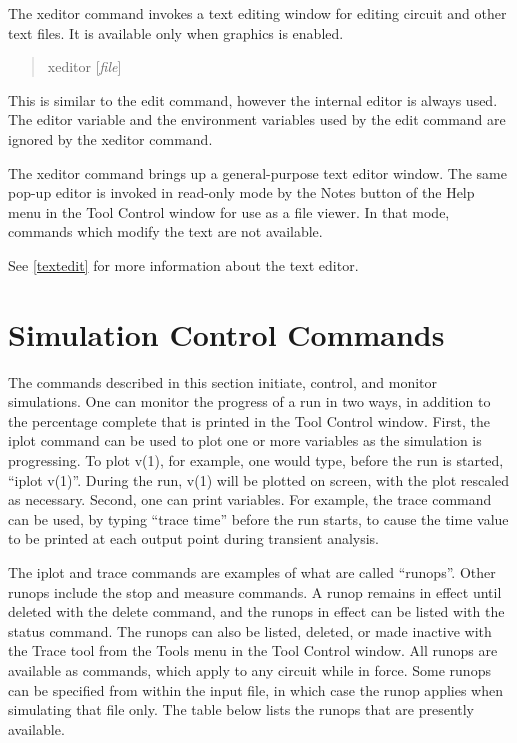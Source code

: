 The {\cb xeditor} command invokes a text editing window for editing
circuit and other text files.  It is available only when graphics is
enabled.
\begin{quote}\vt
xeditor [{\it file\/}]
\end{quote}
This is similar to the {\cb edit} command, however the internal editor
is always used.  The {\et editor} variable and the environment
variables used by the {\cb edit} command are ignored by the {\cb
xeditor} command.

The {\cb xeditor} command brings up a general-purpose text editor
window.  The same pop-up editor is invoked in read-only mode by the
{\cb Notes} button of the {\cb Help} menu in the {\cb Tool Control}
window for use as a file viewer.  In that mode, commands which modify
the text are not available.

See \ref{textedit} for more information about the text editor.


\section{Simulation Control Commands}
\label{simcmds}


The commands described in this section initiate, control, and monitor
{\WRspice} simulations.  One can monitor the progress of a run in two
ways, in addition to the percentage complete that is printed in the
{\cb Tool Control} window.  First, the {\cb iplot} command can be used
to plot one or more variables as the simulation is progressing.  To
plot {\vt v(1)}, for example, one would type, before the run is
started, ``{\vt iplot v(1)}''.  During the run, {\vt v(1)} will be
plotted on screen, with the plot rescaled as necessary.  Second, one
can print variables.  For example, the {\cb trace} command can be
used, by typing ``{\vt trace time}'' before the run starts, to cause
the time value to be printed at each output point during transient
analysis.

\label{runop}
The {\cb iplot} and {\cb trace} commands are examples of what are
called ``runops''.  Other runops include the {\cb stop} and {\cb
measure} commands.  A runop remains in effect until deleted with the
{\cb delete} command, and the runops in effect can be listed with the
{\cb status} command.  The runops can also be listed, deleted, or made
inactive with the {\cb Trace} tool from the {\cb Tools} menu in the
{\cb Tool Control} window.  All runops are available as commands,
which apply to any circuit while in force.  Some runops can be
specified from within the {\WRspice} input file, in which case the
runop applies when simulating that file only.  The table below lists
the runops that are presently available.

